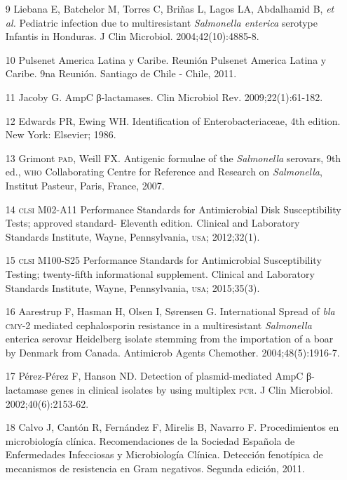 \documentclass{article}
\begin{document}
\begin{itemize}
\item[9] Liebana E, Batchelor M, Torres C, Briñas L, Lagos LA, Abdalhamid B,
\textit{et al.}
Pediatric infection due to multiresistant \textit{Salmonella enterica}
serotype Infantis in Honduras. J Clin Microbiol. 2004;42(10):4885-8.

\item[10] Pulsenet America Latina y Caribe. Reunión Pulsenet America Latina y
Caribe. 9na Reunión. Santiago de Chile - Chile, 2011.

\item[11] Jacoby G. AmpC β-lactamases. Clin Microbiol Rev. 2009;22(1):61-182.

\item[12] Edwards PR, Ewing WH. Identification of Enterobacteriaceae, 4th
edition. New York: Elsevier; 1986.

\item[13] Grimont \textsc{pad}, Weill FX. Antigenic formulae of the
\textit{Salmonella}
serovars, 9th ed., \textsc{who} Collaborating Centre for Reference and Research on
\textit{Salmonella}, Institut Pasteur, Paris, France, 2007.

\item[14] \textsc{clsi} M02-A11 Performance Standards for Antimicrobial Disk
Susceptibility Tests; approved standard- Eleventh edition. Clinical and
Laboratory Standards Institute, Wayne, Pennsylvania, \textsc{usa}; 2012;32(1).

\item[15] \textsc{clsi} M100-S25 Performance Standards for Antimicrobial
Susceptibility Testing; twenty-fifth informational supplement. Clinical and
Laboratory Standards Institute, Wayne, Pennsylvania, \textsc{usa}; 2015;35(3).

\item[16] Aarestrup F, Hasman H, Olsen I, Sørensen G. International Spread of
\textit{bla}
\textsc{cmy}-2 mediated cephalosporin resistance in a multiresistant \textit{Salmonella}
enterica serovar Heidelberg isolate stemming from the importation of a boar by
Denmark from Canada. Antimicrob Agents Chemother. 2004;48(5):1916-7.

\item[17] Pérez-Pérez F, Hanson ND. Detection of plasmid-mediated AmpC
β-lactamase genes in clinical isolates by using multiplex \textsc{pcr}. J Clin Microbiol.
2002;40(6):2153-62.

\item[18] Calvo J, Cantón R, Fernández F, Mirelis B, Navarro F.
Procedimientos en microbiología clínica. Recomendaciones de la Sociedad Española
de Enfermedades Infecciosas y Microbiología Clínica. Detección fenotípica de
mecanismos de resistencia en Gram negativos. Segunda edición, 2011.


\end{itemize}
\end{document}
